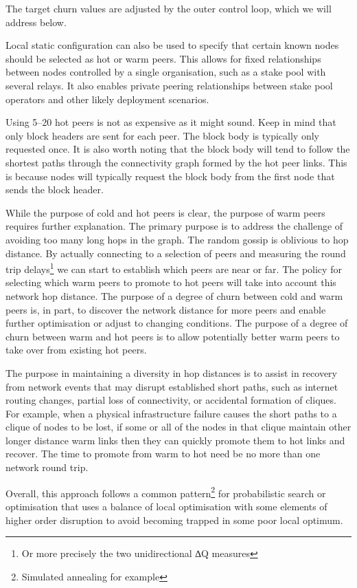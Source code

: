 \documentclass[]{article}
\begin{document}
The target churn values are adjusted by the outer control loop, which we
will address below.

Local static configuration can also be used to specify that certain
known nodes should be selected as hot or warm peers. This allows for
fixed relationships between nodes controlled by a single organisation,
such as a stake pool with several relays. It also enables private
peering relationships between stake pool operators and other likely
deployment scenarios.

Using 5--20 hot peers is not as expensive as it might sound. Keep in
mind that only block headers are sent for each peer. The block body is
typically only requested once. It is also worth noting that the block
body will tend to follow the shortest paths through the connectivity
graph formed by the hot peer links. This is because nodes will typically
request the block body from the first node that sends the block header.

While the purpose of cold and hot peers is clear, the purpose of warm
peers requires further explanation. The primary purpose is to address
the challenge of avoiding too many long hops in the graph. The random
gossip is oblivious to hop distance. By actually connecting to a
selection of peers and measuring the round trip delays\footnote{Or more
  precisely the two unidirectional ∆Q measures} we can start to
establish which peers are near or far. The policy for selecting which
warm peers to promote to hot peers will take into account this network
hop distance. The purpose of a degree of churn between cold and warm
peers is, in part, to discover the network distance for more peers and
enable further optimisation or adjust to changing conditions. The
purpose of a degree of churn between warm and hot peers is to allow
potentially better warm peers to take over from existing hot peers.

The purpose in maintaining a diversity in hop distances is to assist in
recovery from network events that may disrupt established short paths,
such as internet routing changes, partial loss of connectivity, or
accidental formation of cliques. For example, when a physical
infrastructure failure causes the short paths to a clique of nodes to be
lost, if some or all of the nodes in that clique maintain other longer
distance warm links then they can quickly promote them to hot links and
recover. The time to promote from warm to hot need be no more than one
network round trip.

Overall, this approach follows a common pattern\footnote{Simulated
  annealing for example} for probabilistic search or optimisation that
uses a balance of local optimisation with some elements of higher order
disruption to avoid becoming trapped in some poor local optimum.
\end{document}
